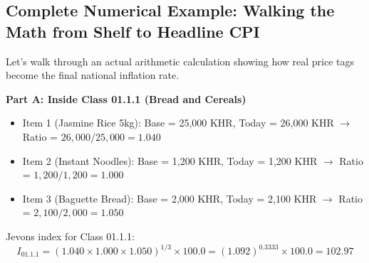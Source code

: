 \documentclass[11pt,a4paper,oneside]{article}
\begin{document}
\subsection{Complete Numerical Example: Walking the Math from Shelf to Headline CPI}
Let's walk through an actual arithmetic calculation showing how real price tags become the final national inflation rate.

\begin{tcolorbox}[colback=white,colframe=NavyBlue,title=\textbf{Worked Arithmetic: Calculating the Food Division and Headline CPI}]
\small
\textbf{Part A: Inside Class 01.1.1 (Bread and Cereals)}
\begin{itemize}[noitemsep]
    \item Item 1 (Jasmine Rice 5kg): Base = 25,000 KHR, Today = 26,000 KHR $\rightarrow$ Ratio = $26,000 / 25,000 = \mathbf{1.040}$
    \item Item 2 (Instant Noodles): Base = 1,200 KHR, Today = 1,200 KHR $\rightarrow$ Ratio = $1,200 / 1,200 = \mathbf{1.000}$
    \item Item 3 (Baguette Bread): Base = 2,000 KHR, Today = 2,100 KHR $\rightarrow$ Ratio = $2,100 / 2,000 = \mathbf{1.050}$
\end{itemize}
Jevons index for Class 01.1.1:
$$I_{01.1.1} = \left( 1.040 \times 1.000 \times 1.050 \right)^{1/3} \times 100.0 = (1.092)^{0.3333} \times 100.0 = \mathbf{102.97}$$


\end{tcolorbox}
\end{document}
